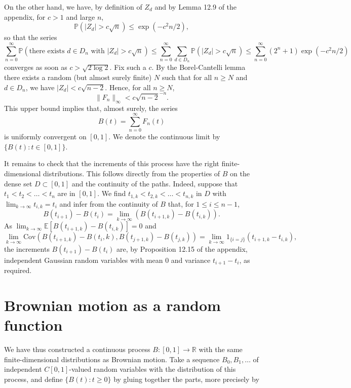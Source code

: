 \documentclass{article}
\begin{document}
On the other hand, we have, by definition of $Z_d$ and by Lemma 12.9 of the appendix, for $c > 1$ and large $n$,
\[
    \mathbb{P}(|Z_d| > c\sqrt{n}) \leq \exp\left( -c^2 n / 2 \right),
\]
so that the series
\[
    \sum_{n=0}^{\infty} \mathbb{P} \left( \text{there exists } d \in D_n \text{ with } |Z_d| > c \sqrt{n} \right)
    \leq \sum_{n=0}^{\infty} \sum_{d \in D_n} \mathbb{P}(|Z_d| > c\sqrt{n})
    \leq \sum_{n=0}^{\infty} (2^n + 1) \exp\left( -c^2 n / 2 \right)
\]
converges as soon as $c > \sqrt{2 \log 2}$. Fix such a $c$. By the Borel-Cantelli lemma there exists a random (but almost surely finite) $N$ such that for all $n \geq N$ and $d \in D_n$, we have $|Z_d| < c \sqrt{n - 2}$. Hence, for all $n \geq N$,
\[
    \| F_n \|_{\infty} < c \sqrt{n - 2}^{-n}. \tag{1.2}
\]
This upper bound implies that, almost surely, the series
\[
    B(t) = \sum_{n=0}^{\infty} F_n(t)
\]
is uniformly convergent on $[0, 1]$. We denote the continuous limit by $\{ B(t) : t \in [0, 1] \}$.

It remains to check that the increments of this process have the right finite-dimensional distributions. This follows directly from the properties of $B$ on the dense set $D \subset [0, 1]$ and the continuity of the paths. Indeed, suppose that $t_1 < t_2 < \dots < t_n$ are in $[0, 1]$. We find $t_{1,k} < t_{2,k} < \dots < t_{n,k}$ in $D$ with $\lim_{k \to \infty} t_{i,k} = t_i$ and infer from the continuity of $B$ that, for $1 \leq i \leq n - 1$,
\[
    B(t_{i+1}) - B(t_i) = \lim_{k \to \infty} (B(t_{i+1,k}) - B(t_{i,k})).
\]
As $\lim_{k \to \infty} \mathbb{E} \left[ B(t_{i+1,k}) - B(t_{i,k}) \right] = 0$ and
\[
    \lim_{k \to \infty} \text{Cov} \left( B(t_{i+1,k}) - B(t_i,k), B(t_{j+1,k}) - B(t_{j,k}) \right)
    = \lim_{k \to \infty} 1_{\{i=j\}} (t_{i+1,k} - t_{i,k}),
\]
the increments $B(t_{i+1}) - B(t_i)$ are, by Proposition 12.15 of the appendix, independent Gaussian random variables with mean $0$ and variance $t_{i+1} - t_i$, as required.



\section*{Brownian motion as a random function}

We have thus constructed a continuous process $B : [0, 1] \rightarrow \mathbb{R}$ with the same finite-dimensional distributions as Brownian motion. Take a sequence $B_0, B_1, \ldots$ of independent $C[0,1]$-valued random variables with the distribution of this process, and define $\{B(t) : t \geq 0\}$ by gluing together the parts, more precisely by
\end{document}
